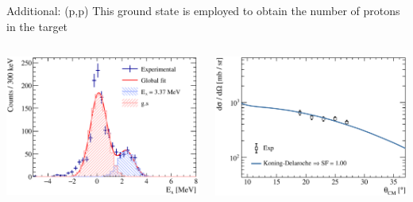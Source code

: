\documentclass[aspectratio=43, dvipsnames]{beamer}
\newcommand{\iso}[2]{\ce{^{#1}#2}}
\begin{document}
\begin{frame}[c,noframenumbering]{Additional: \texorpdfstring{\iso{10}{Be}(p,p)}{10Be(p,p)}}
    This ground state is employed to obtain the number of protons in the target
    \begin{columns}[c]
        \begin{column}{0.5\linewidth}
            \includegraphics[width=\linewidth]{figures/10Be_pp_fit.eps}
        \end{column}\hfill
        \begin{column}{0.5\linewidth}
            \includegraphics[width=\linewidth]{figures/10Be_pp_g0.eps}
        \end{column}
    \end{columns}

\end{frame}
\end{document}
